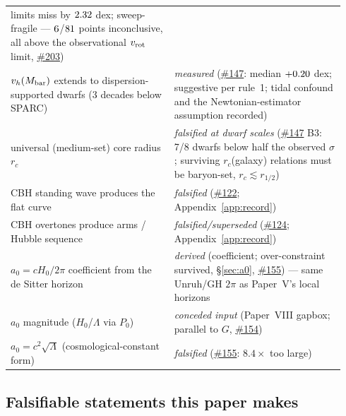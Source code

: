 \documentclass[11pt,a4paper]{article}
\providecommand{\ssvissue}[1]{\hyperref[issue:#1]{\##1}}
\begin{document}
\begin{center}
\begin{tabular}{@{}p{0.46\linewidth}p{0.48\linewidth}@{}}
limits miss by $2.32$ dex; sweep-fragile ---
$6$/$81$ points inconclusive,
all above the observational $v_{\rm rot}$ limit, \ssvissue{203}) \\
$v_h(M_{\rm bar})$ extends to dispersion-supported dwarfs (3 decades
below SPARC) &
\emph{measured} (\ssvissue{147}: median $+0.20$ dex;
suggestive per rule~1; tidal confound and the Newtonian-estimator
assumption recorded) \\
universal (medium-set) core radius $r_c$ &
\emph{falsified at dwarf scales} (\ssvissue{147} B3: 7/8 dwarfs below
half the observed $\sigma$; surviving $r_c$(galaxy) relations must be
baryon-set, $r_c \lesssim r_{1/2}$) \\
CBH standing wave produces the flat curve &
\emph{falsified} (\ssvissue{122}; Appendix~\ref{app:record}) \\
CBH overtones produce arms / Hubble sequence &
\emph{falsified/superseded} (\ssvissue{124};
Appendix~\ref{app:record}) \\
$a_0 = cH_0/2\pi$ coefficient from the de Sitter horizon &
\emph{derived} (coefficient; over-constraint survived, \S\ref{sec:a0},
\ssvissue{155}) --- same Unruh/GH $2\pi$ as Paper~V's local horizons \\
$a_0$ magnitude ($H_0$/$\Lambda$ via $P_0$) &
\emph{conceded input} (Paper~VIII gapbox; parallel to $G$, \ssvissue{154}) \\
$a_0 = c^2\sqrt{\Lambda}$ (cosmological-constant form) &
\emph{falsified} (\ssvissue{155}: $8.4\times$ too large) \\
\bottomrule
\end{tabular}
\end{center}

\subsection{Falsifiable statements this paper makes}
\end{document}

